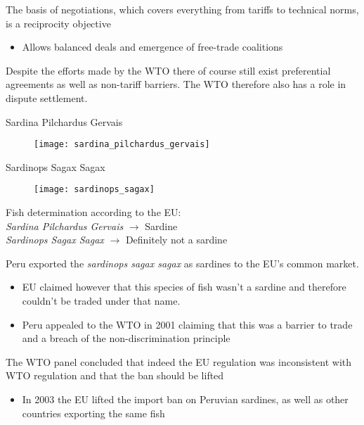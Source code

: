 \documentclass{beamer}
\begin{document}
\begin{frame}  
 The basis of negotiations, which covers everything from tariffs to technical norms, is a reciprocity objective
 \begin{itemize}
   \item Allows balanced deals and emergence of free-trade coalitions
 \end{itemize}
 \medskip
 Despite the efforts made by the WTO there of course still exist preferential agreements as well as non-tariff barriers.
 The WTO therefore also has a role in dispute settlement. 
\end{frame}

\begin{frame}{Sardina Pilchardus Gervais}
  \begin{figure}
    \texttt{[image: sardina\_pilchardus\_gervais]}
  \end{figure}
\end{frame}

\begin{frame}{Sardinops Sagax Sagax}
  \begin{figure}
    \texttt{[image: sardinops\_sagax]}
  \end{figure}
\end{frame}

\begin{frame}
 Fish determination according to the EU:\\ \medskip
 \textit{Sardina Pilchardus Gervais} $\rightarrow$ Sardine\\
 \textit{Sardinops Sagax Sagax} $\rightarrow$ Definitely not a sardine
\end{frame}


\begin{frame}
  Peru exported the \textit{sardinops sagax sagax} as sardines to the EU's common market.
  \begin{itemize}
    \item EU claimed however that this species of fish wasn't a sardine and therefore couldn't be traded under that name.
    \item Peru appealed to the WTO in 2001 claiming that this was a barrier to trade and a breach of the non-discrimination principle
  \end{itemize}
  \medskip
  The WTO panel concluded that indeed the EU regulation was inconsistent with WTO regulation and that the ban should be lifted
  \begin{itemize}
    \item In 2003 the EU lifted the import ban on Peruvian sardines, as well as other countries exporting the same fish
  \end{itemize}  
\end{frame}
\end{document}
